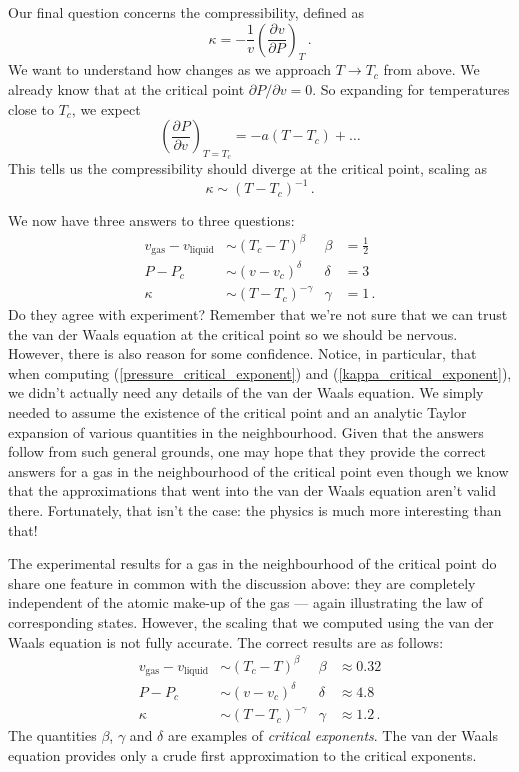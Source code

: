 \documentclass{article}
\theoremstyle{plain}\theoremheaderfont{\normalfont\bfseries}\theorembodyfont{\rmfamily}\theoremseparator{.}\newtheorem*{thm}{Theorem}\newtheorem*{law}{Law}\newtheorem*{pos}{Postulate}
\numberwithin{equation}{section}
\newcommand{\pdv}[3][]{\frac{\partial^{#1} #2}{{\partial #3}^{#1}}}
\begin{document}
    Our final question concerns the compressibility, defined as
    \begin{equation}
        \kappa=-\frac{1}{v}\left(\pdv{v}{P}\right)_T\,.
    \end{equation}
    We want to understand how changes as we approach \(T\to T_c\) from above. We already know that at the critical point \(\partial P/\partial v=0\). So expanding for temperatures close to \(T_c\), we expect
    \begin{equation}
        \left(\pdv{P}{v}\right)_{T=T_c}=-a(T-T_c)+\dots
    \end{equation}
    This tells us the compressibility should diverge at the critical point, scaling as
    \begin{equation}\label{kappa_critical_exponent}
        \kappa\sim (T-T_c)^{-1}\,.
    \end{equation}

    We now have three answers to three questions:
    \begin{align}
        v_{\text{gas}}-v_{\text{liquid}}&\sim(T_c-T)^{\beta} & \beta&=\frac{1}{2} \\
        P-P_c&\sim(v-v_c)^\delta & \delta&=3 \\
        \kappa&\sim(T-T_c)^{-\gamma} & \gamma&=1\,.
    \end{align}
    Do they agree with experiment? Remember that we're not sure that we can trust the van der Waals equation at the critical point so we should be nervous. However, there is also reason for some confidence. Notice, in particular, that when computing (\ref{pressure_critical_exponent}) and (\ref{kappa_critical_exponent}), we didn't actually need any details of the van der Waals equation. We simply needed to assume the existence of the critical point and an analytic Taylor expansion of various quantities in the neighbourhood. Given that the answers follow from such general grounds, one may hope that they provide the correct answers for a gas in the neighbourhood of the critical point even though we know that the approximations that went into the van der Waals equation aren't valid there. Fortunately, that isn't the case: the physics is much more interesting than that!

    The experimental results for a gas in the neighbourhood of the critical point do share one feature in common with the discussion above: they are completely independent of the atomic make-up of the gas --- again illustrating the law of corresponding states. However, the scaling that we computed using the van der Waals equation is not fully accurate. The correct results are as follows:
    \begin{align}
        v_{\text{gas}}-v_{\text{liquid}}&\sim(T_c-T)^{\beta} & \beta&\approx 0.32 \\
        P-P_c&\sim(v-v_c)^\delta & \delta&\approx4.8 \\
        \kappa&\sim(T-T_c)^{-\gamma} & \gamma&\approx 1.2\,.
    \end{align}
    The quantities \(\beta\), \(\gamma\) and \(\delta\) are examples of \textit{critical exponents}. The van der Waals equation provides only a crude first approximation to the critical exponents.
\end{document}
